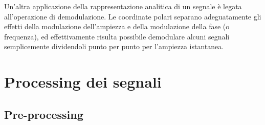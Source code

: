 \documentclass[a4paper, 12pt]{book}
\begin{document}
Un’altra applicazione della rappresentazione analitica di un segnale è legata all'operazione di demodulazione.
Le coordinate polari separano adeguatamente gli effetti della modulazione dell’ampiezza e della modulazione della fase (o frequenza), ed effettivamente risulta possibile demodulare alcuni segnali semplicemente dividendoli punto per punto per l'ampiezza istantanea.



\section{Processing dei segnali}


\subsection{Pre-processing}
\end{document}
